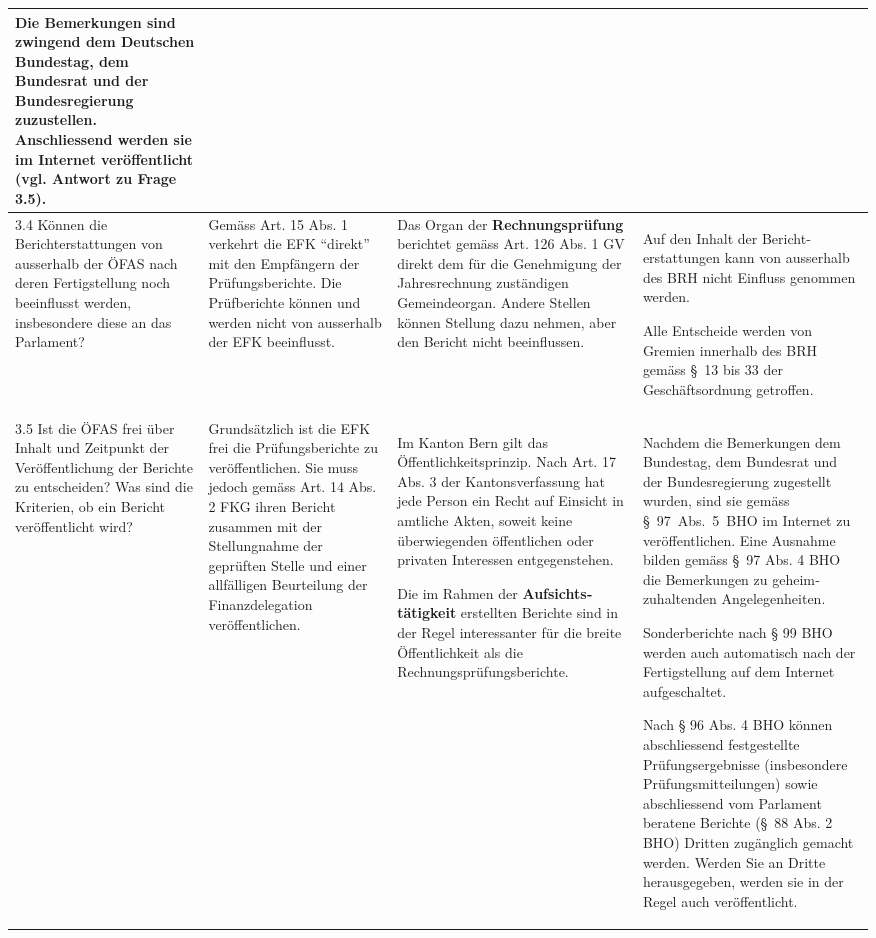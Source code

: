 \documentclass[10pt]{article}
\begin{document}
\begin{landscape}
\begin{center}
\begin{longtable}{|p{4cm}|p{5cm}|p{7.5cm}|p{7.5cm}|}
Die Bemerkungen sind zwingend dem Deutschen Bundestag, dem Bundesrat und der Bundesregierung zuzustellen. Anschliessend werden sie im Internet veröffentlicht (vgl. Antwort zu Frage 3.5).

 \\
\hline
3.4 Können die Berichterstattungen von ausserhalb der ÖFAS nach deren Fertigstellung noch beeinflusst werden, insbesondere diese an das Parlament? & Gemäss Art. 15 Abs. 1 verkehrt die EFK “{}direkt”{} mit den Empfängern der Prüfungsberichte. Die Prüfberichte können und werden nicht von ausserhalb der EFK beeinflusst. & Das Organ der \textbf{Rechnungs­prüfung} berichtet gemäss Art. 126 Abs. 1 GV direkt dem für die Genehmigung der Jahresrechnung zuständigen Gemeindeorgan. Andere Stellen können Stellung dazu nehmen, aber den Bericht nicht beeinflussen. & Auf den Inhalt der Bericht­erstattungen kann von ausserhalb des BRH nicht Einfluss genommen werden.

Alle Entscheide werden von Gremien innerhalb des BRH gemäss §~13 bis 33 der Geschäftsordnung getroffen.

 \\
\hline
3.5 Ist die ÖFAS frei über Inhalt und Zeitpunkt der Veröffentlichung der Berichte zu entscheiden? Was sind die Kriterien, ob ein Bericht veröffentlicht wird? & Grundsätzlich ist die EFK frei die Prüfungsberichte zu veröffentlichen. Sie muss jedoch gemäss Art. 14 Abs. 2 FKG ihren Bericht zusammen mit der Stellungnahme der geprüften Stelle und einer allfälligen Beurteilung der Finanzdelegation veröffentlichen. & Im Kanton Bern gilt das Öffentlichkeitsprinzip. Nach Art. 17 Abs. 3 der Kantons­verfassung hat jede Person ein Recht auf Einsicht in amtliche Akten, soweit keine überwiegenden öffentlichen oder privaten Interessen entgegen­stehen.

Die im Rahmen der \textbf{Aufsichts­tätigkeit} erstellten Berichte sind in der Regel interessanter für die breite Öffentlichkeit als die Rechnungsprüfungsberichte.

 & Nachdem die Bemerkungen dem Bundestag, dem Bundes­rat und der Bundes­regierung zugestellt wurden, sind sie gemäss §~97~Abs.~5~BHO im Internet zu veröffentlichen. Eine Aus­nahme bilden gemäss §~97 Abs. 4 BHO die Bemerkungen zu geheim­zuhaltenden Angele­gen­heiten. 

Sonderberichte nach § 99 BHO werden auch automatisch nach der Fertigstellung auf dem Internet aufgeschaltet.

Nach § 96 Abs. 4 BHO können abschliessend festgestellte Prüfungsergebnisse (insbesondere Prüfungsmitteilungen) sowie abschliessend vom Parlament beratene Berichte (§~88 Abs. 2 BHO) Dritten zugänglich gemacht werden. Werden Sie an Dritte herausgegeben, werden sie in der Regel auch veröffentlicht.


\end{longtable}
\end{center}
\end{landscape}
\end{document}
